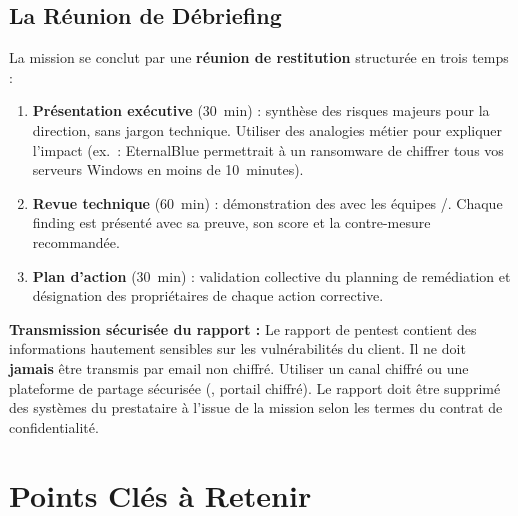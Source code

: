 \subsection{La Réunion de Débriefing}
\label{subsec:debrief}

La mission se conclut par une \textbf{réunion de restitution} structurée
en trois temps :

\begin{enumerate}
    \item \textbf{Présentation exécutive} (30~min) : synthèse des risques
          majeurs pour la direction, sans jargon technique. Utiliser
          des analogies métier pour expliquer l'impact (ex.~:
          \og{}EternalBlue permettrait à un ransomware de chiffrer tous
          vos serveurs Windows en moins de 10~minutes\fg{}).
    \item \textbf{Revue technique} (60~min) : démonstration des 
          avec les équipes /. Chaque finding est
          présenté avec sa preuve, son score  et la
          contre-mesure recommandée.
    \item \textbf{Plan d'action} (30~min) : validation collective du
          planning de remédiation et désignation des propriétaires de
          chaque action corrective.
\end{enumerate}

\begin{boxalert}
\textbf{Transmission sécurisée du rapport :} Le rapport de pentest contient
des informations hautement sensibles sur les vulnérabilités du client.
Il ne doit \textbf{jamais} être transmis par email non chiffré. Utiliser
un canal chiffré  ou une plateforme de partage sécurisée
(, portail chiffré). Le rapport doit être supprimé des
systèmes du prestataire à l'issue de la mission selon les termes du
contrat de confidentialité.
\end{boxalert}

\section*{Points Clés à Retenir}

